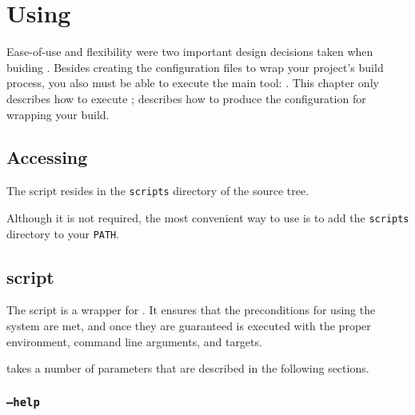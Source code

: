 %
%
%
%
\chapter{Using \lmsbw}

Ease-of-use and flexibility were two important design decisions taken
when buiding \lmsbw.  Besides creating the configuration files to wrap
your project's build process, you also must be able to execute the
main tool: \lmsbw.  This chapter only describes how to execute \lmsbw;
 describes how to produce the configuration for
wrapping your build.

\section{Accessing \lmsbw}

The \lmsbw script resides in the \texttt{scripts} directory of the
\lmsbw source tree.

Although it is not required, the most convenient way to use \lmsbw is
to add the \texttt{scripts} directory to your \texttt{PATH}.

\section{\lmsbw script}

The \lmsbw script is a wrapper for \make.  It ensures that the
preconditions for using the \lmsbw system are met, and once they are
guaranteed \make is executed with the proper environment, command line
arguments, and targets.

\lmsbw takes a number of parameters that are described in the
following sections.

\subsection{\texttt{--help}}

